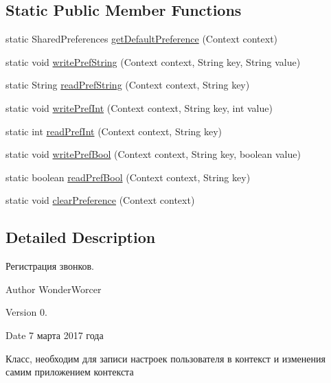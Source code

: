 \subsection*{Static Public Member Functions}
\begin{DoxyCompactItemize}
\item 
static Shared\+Preferences \hyperlink{classcom_1_1aykuttasil_1_1callrecord_1_1helper_1_1_prefs_helper_a76641fc5715d4412e827c933192671a8}{get\+Default\+Preference} (Context context)
\item 
static void \hyperlink{classcom_1_1aykuttasil_1_1callrecord_1_1helper_1_1_prefs_helper_a3cf23eb8e76213d5155fee0367406d59}{write\+Pref\+String} (Context context, String key, String value)
\item 
static String \hyperlink{classcom_1_1aykuttasil_1_1callrecord_1_1helper_1_1_prefs_helper_ae19f5a277e32ab8af94ddf6483638055}{read\+Pref\+String} (Context context, String key)
\item 
static void \hyperlink{classcom_1_1aykuttasil_1_1callrecord_1_1helper_1_1_prefs_helper_a2fbd2a41d2ba031c9e1f0031364a970b}{write\+Pref\+Int} (Context context, String key, int value)
\item 
static int \hyperlink{classcom_1_1aykuttasil_1_1callrecord_1_1helper_1_1_prefs_helper_af5d55ee9a54f2d21b1d46b48c58653a3}{read\+Pref\+Int} (Context context, String key)
\item 
static void \hyperlink{classcom_1_1aykuttasil_1_1callrecord_1_1helper_1_1_prefs_helper_a150a57350ee1b4ba0f3d4c03cecc52b3}{write\+Pref\+Bool} (Context context, String key, boolean value)
\item 
static boolean \hyperlink{classcom_1_1aykuttasil_1_1callrecord_1_1helper_1_1_prefs_helper_a8c9acf31069d845c987e1f1dfe5b6e40}{read\+Pref\+Bool} (Context context, String key)
\item 
static void \hyperlink{classcom_1_1aykuttasil_1_1callrecord_1_1helper_1_1_prefs_helper_a96d6039f112bd5e5f945c30566019084}{clear\+Preference} (Context context)
\end{DoxyCompactItemize}


\subsection{Detailed Description}
Регистрация звонков. 

\begin{DoxyAuthor}{Author}
Wonder\+Worcer 
\end{DoxyAuthor}
\begin{DoxyVersion}{Version}
0. 
\end{DoxyVersion}
\begin{DoxyDate}{Date}
7 марта 2017 года
\end{DoxyDate}
Класс, необходим для записи настроек пользователя в контекст и изменения самим приложением контекста 

